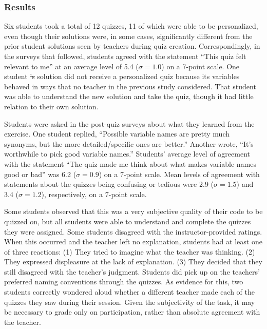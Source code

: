 \documentclass[12pt,twoside]{mitthesis}
\providecommand{\DIFdeltex}[1]{{\protect\color{red}\sout{#1}}}                      %
\providecommand{\DIFdelbegin}{} %
\providecommand{\DIFdelend}{} %
\providecommand{\DIFdel}[1]{\texorpdfstring{\DIFdeltex{#1}}{}} %
\begin{document}
\subsubsection{Results}
\DIFdelbegin %

\DIFdelend %
Six students took a total of 12 quizzes, 11 of which were able to be personalized, even though their solutions were, in some cases, significantly different from the prior student solutions seen by teachers during quiz creation. Correspondingly, in the surveys that followed, students agreed with the statement ``This quiz felt relevant to me'' at an average level of 5.4 ($\sigma = 1.0$) on a 7-point scale. One student \DIFdelbegin \DIFdel{'s }\DIFdelend solution did not receive a personalized quiz because its variables behaved in ways that no teacher in the previous study considered. That student was able to understand the new solution and take the quiz, though it had little relation to their own solution.

Students were asked in the post-quiz surveys about what they learned from the exercise. One student replied, ``Possible variable names are pretty much synonyms, but the more detailed/specific ones are better.'' Another wrote, ``It's worthwhile to pick good variable names.'' Students' average level of agreement with the statement ``The quiz made me think about what makes variable names good or bad'' was 6.2 ($\sigma = 0.9$) on a 7-point scale. Mean levels of agreement with statements about the quizzes being confusing or tedious were 2.9 ($\sigma = 1.5$) and 3.4 ($\sigma = 1.2$), respectively, on a 7-point scale.

Some students observed that this was a very subjective quality of their code to be quizzed on, but all students were able to understand and complete the quizzes they were assigned. Some students disagreed with the instructor-provided ratings. When this occurred and the teacher left no explanation, students had at least one of three reactions: (1) They tried to imagine what the teacher was thinking. (2) They expressed displeasure at the lack of explanation. (3) They decided that they still disagreed with the teacher's judgment. Students did pick up on the teachers' preferred naming conventions through the quizzes. As evidence for this, two students correctly wondered aloud whether a different teacher made each of the quizzes they saw during their session. Given the subjectivity of the task, it may be necessary to grade only on participation, rather than absolute agreement with the teacher.
\end{document}
